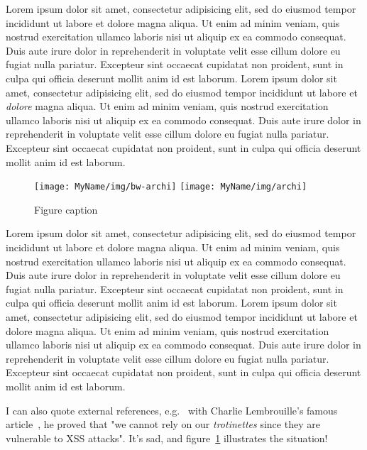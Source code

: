 Lorem ipsum dolor sit amet, consectetur adipisicing elit, sed do
eiusmod tempor incididunt ut labore et dolore magna aliqua. Ut enim ad
minim veniam, quis nostrud exercitation ullamco laboris nisi ut
aliquip ex ea commodo consequat. Duis aute irure dolor in
reprehenderit in voluptate velit esse cillum dolore eu fugiat nulla
pariatur. Excepteur sint occaecat cupidatat non proident, sunt in
culpa qui officia deserunt mollit anim id est laborum. Lorem ipsum
dolor sit amet, consectetur adipisicing elit, sed do eiusmod tempor
incididunt ut labore et \emph{dolore} magna aliqua. Ut enim ad minim
veniam, quis nostrud exercitation ullamco laboris nisi ut aliquip ex
ea commodo consequat. Duis aute irure dolor in reprehenderit in
voluptate velit esse cillum dolore eu fugiat nulla pariatur. Excepteur
sint occaecat cupidatat non proident, sunt in culpa qui officia
deserunt mollit anim id est laborum.


\begin{figure}[ht]
  \centering
  \ifssticbw
    \texttt{[image: MyName/img/bw-archi]}
  \else
    \texttt{[image: MyName/img/archi]}
  \fi
  \caption{Figure caption}
  \label{fig:myname:archi}
\end{figure}

Lorem ipsum dolor sit amet, consectetur adipisicing elit, sed do
eiusmod tempor incididunt ut labore et dolore magna aliqua. Ut enim ad
minim veniam, quis nostrud exercitation ullamco laboris nisi ut
aliquip ex ea commodo consequat. Duis aute irure dolor in
reprehenderit in voluptate velit esse cillum dolore eu fugiat nulla
pariatur. Excepteur sint occaecat cupidatat non proident, sunt in
culpa qui officia deserunt mollit anim id est laborum. Lorem ipsum
dolor sit amet, consectetur adipisicing elit, sed do eiusmod tempor
incididunt ut labore et dolore magna aliqua. Ut enim ad minim veniam,
quis nostrud exercitation ullamco laboris nisi ut aliquip ex ea
commodo consequat. Duis aute irure dolor in reprehenderit in voluptate
velit esse cillum dolore eu fugiat nulla pariatur. Excepteur sint
occaecat cupidatat non proident, sunt in culpa qui officia deserunt
mollit anim id est laborum.



I can also quote external references, e.g.~ with Charlie Lembrouille's
famous article~\cite{myname:charlielembrouille}, he proved that "we
cannot rely on our \emph{trotinettes} since they are vulnerable to XSS
attacks". It's sad, and figure~\ref{fig:myname:archi} illustrates the
situation!


